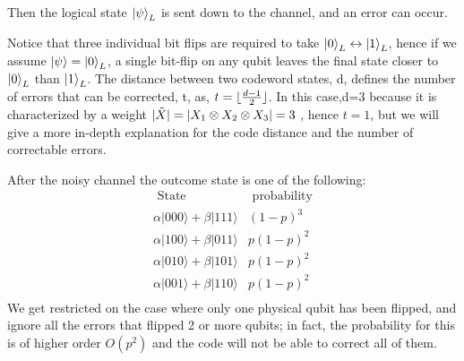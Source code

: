 Then the logical state $\ket{\psi}_L$ is sent down to the channel, and an error can occur. 


Notice that three individual bit flips are required to take $\ket{0}_L \leftrightarrow \ket{1}_L$, hence if we assume $\ket{\psi} = \ket{0}_L$, a single bit-flip on any qubit leaves the final state closer to $\ket{0}_L$ than $\ket{1}_L$. The distance between two codeword states, d, defines the number of errors that can be corrected, t, as, $t=\lfloor\frac{d-1}{2}\rfloor$. In this case,d=3 because it is characterized by a weight $|\Tilde{X}|=|X_1 \otimes X_2 \otimes X_3 | = 3$ , hence $t=1$, but we will give a more in-depth explanation for the code distance and the number of correctable errors.



After the noisy channel the outcome state is one of the following:
\begin{equation*}
\begin{array}{ll}
\text { State } & \text { probability} \\
\alpha|000\rangle+\beta|111\rangle & (1-p)^{3} \\
\alpha|100\rangle+\beta|011\rangle & p(1-p)^{2} \\
\alpha|010\rangle+\beta|101\rangle & p(1-p)^{2} \\
\alpha|001\rangle+\beta|110\rangle & p(1-p)^{2} \\
\end{array}
\end{equation*}
We get restricted on the case where only one physical qubit has been flipped, and ignore all the errors that flipped 2 or more qubits; in fact, the probability for this is of higher order $O(p^2)$ and the code will not be able to correct all of them.


